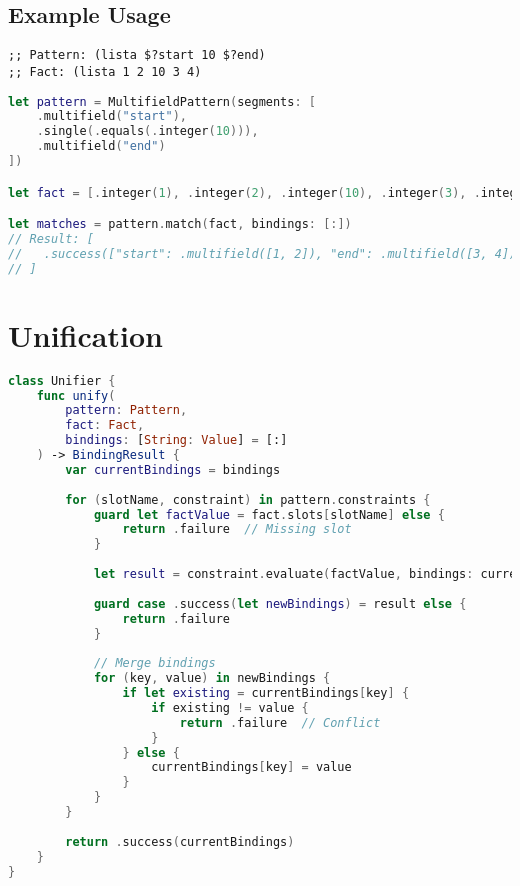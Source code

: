 \subsection{Example Usage}

\begin{lstlisting}[language=CLIPS]
;; Pattern: (lista $?start 10 $?end)
;; Fact: (lista 1 2 10 3 4)
\end{lstlisting}

\begin{lstlisting}[language=Swift]
let pattern = MultifieldPattern(segments: [
    .multifield("start"),
    .single(.equals(.integer(10))),
    .multifield("end")
])

let fact = [.integer(1), .integer(2), .integer(10), .integer(3), .integer(4)]

let matches = pattern.match(fact, bindings: [:])
// Result: [
//   .success(["start": .multifield([1, 2]), "end": .multifield([3, 4])])
// ]
\end{lstlisting}

\section{Unification}

\begin{lstlisting}[language=Swift]
class Unifier {
    func unify(
        pattern: Pattern,
        fact: Fact,
        bindings: [String: Value] = [:]
    ) -> BindingResult {
        var currentBindings = bindings
        
        for (slotName, constraint) in pattern.constraints {
            guard let factValue = fact.slots[slotName] else {
                return .failure  // Missing slot
            }
            
            let result = constraint.evaluate(factValue, bindings: currentBindings)
            
            guard case .success(let newBindings) = result else {
                return .failure
            }
            
            // Merge bindings
            for (key, value) in newBindings {
                if let existing = currentBindings[key] {
                    if existing != value {
                        return .failure  // Conflict
                    }
                } else {
                    currentBindings[key] = value
                }
            }
        }
        
        return .success(currentBindings)
    }
}
\end{lstlisting}

